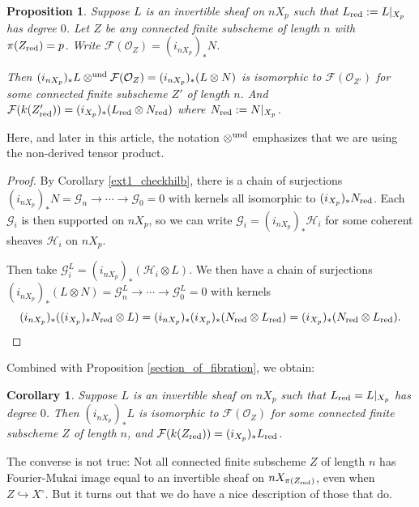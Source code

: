 \documentclass{amsart}
\theoremstyle{plain}
\newtheorem{proposition}[theorem]{Proposition}
\newtheorem{corollary}[theorem]{Corollary}
\theoremstyle{definition}
\theoremstyle{remark}
\begin{document}
    \begin{proposition}\label{multiply}
        Suppose $L$ is an invertible sheaf on $nX_p$ such that $L_{\rm red}:=L|_{X_p}$ has degree $0$.
        Let $Z$ be any connected finite subscheme of length $n$ with $\pi(Z_{\rm red})=p$.
        Write $\mathcal F(\mathcal O_Z)=(i_{nX_p})_\ast N$.

        Then $(i_{nX_p})_\ast L\otimes^{\rm und} \mathcal F(\mathcal O_Z)=(i_{nX_p})_\ast(L\otimes N)$ is isomorphic to $\mathcal F(\mathcal O_{Z'})$ for some connected finite subscheme $Z'$ of length $n$.
        And $\mathcal F(k(Z_{\rm red}'))=(i_{X_p})_\ast(L_{\rm red}\otimes N_{\rm red})$ where $N_{\rm red}:=N|_{X_p}$.
    \end{proposition}
    Here, and later in this article, the notation $\otimes^{\rm und}$ emphasizes that we are using the non-derived tensor product.
    \begin{proof}
        By Corollary \ref{ext1_checkhilb}, there is a chain of surjections $(i_{nX_p})_\ast N=\mathcal G_n\to\cdots\to\mathcal G_0=0$ with kernels all isomorphic to $(i_{X_p})_\ast N_{\rm red}$.
        Each $\mathcal G_i$ is then supported on $nX_p$, so we can write $\mathcal G_i=(i_{nX_p})_\ast\mathcal H_i$ for some coherent sheaves $\mathcal H_i$ on $nX_p$.

        Then take $\mathcal G_i^L=(i_{nX_p})_\ast(\mathcal H_i\otimes L)$.
        We then have a chain of surjections $(i_{nX_p})_\ast (L\otimes N)=\mathcal G_n^L\to\cdots\to\mathcal G_0^L=0$ with kernels
        \[(i_{nX_p})_\ast ((i_{X_p})_\ast N_{\rm red}\otimes L)=(i_{nX_p})_\ast (i_{X_p})_\ast (N_{\rm red}\otimes L_{\rm red})=(i_{X_p})_\ast (N_{\rm red}\otimes L_{\rm red}).\qedhere\]
    \end{proof}
    Combined with Proposition \ref{section_of_fibration}, we obtain:
    \begin{corollary}
        Suppose $L$ is an invertible sheaf on $nX_p$ such that $L_{\rm red}=L|_{X_p}$ has degree $0$.
        Then $(i_{nX_p})_\ast L$ is isomorphic to $\mathcal F(\mathcal O_Z)$ for some connected finite subscheme $Z$ of length $n$, and $\mathcal F(k(Z_{\rm red}))=(i_{X_p})_\ast L_{\rm red}$.
    \end{corollary}
    The converse is not true:
    Not all connected finite subscheme $Z$ of length $n$ has Fourier-Mukai image equal to an invertible sheaf on $nX_{\pi(Z_{\rm red})}$, even when $Z\hookrightarrow X^\circ$.
    But it turns out that we do have a nice description of those that do.
\end{document}
